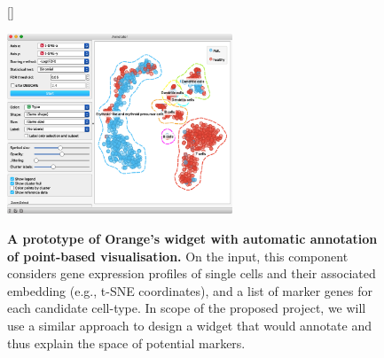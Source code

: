 \documentclass[11pt,a4paper]{article}
\renewcommand{\bold}{\textbf}
\begin{document}
\begin{figure}
[\FBwidth]
{\caption{\small\bold{A prototype of Orange's widget with automatic annotation of point-based visualisation.} On the input, this component considers gene expression profiles of single cells and their associated embedding (e.g., t-SNE coordinates), and a list of marker genes for each candidate cell-type. In scope of the proposed project, we will use a similar approach to design a widget that would annotate and thus explain the space of potential markers.}
\label{fig:annotation}}
{\includegraphics[width=0.6\textwidth]{annotation}}
\end{figure}
\end{document}
